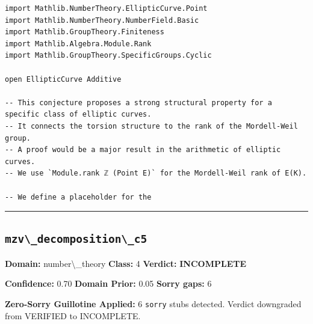\documentclass[12pt,a4paper]{article}
\begin{document}
\begin{lstlisting}[caption={Lean 4 Sketch (v14 Galois)}]
import Mathlib.NumberTheory.EllipticCurve.Point
import Mathlib.NumberTheory.NumberField.Basic
import Mathlib.GroupTheory.Finiteness
import Mathlib.Algebra.Module.Rank
import Mathlib.GroupTheory.SpecificGroups.Cyclic

open EllipticCurve Additive

-- This conjecture proposes a strong structural property for a specific class of elliptic curves.
-- It connects the torsion structure to the rank of the Mordell-Weil group.
-- A proof would be a major result in the arithmetic of elliptic curves.
-- We use `Module.rank ℤ (Point E)` for the Mordell-Weil rank of E(K).

-- We define a placeholder for the 
\end{lstlisting}

\hrule\medskip

\subsection*{\texttt{mzv\textbackslash{}_decomposition\textbackslash{}_c5}}

\textbf{Domain:} number\textbackslash{}_theory \quad \textbf{Class:} 4 \quad \textbf{Verdict:} \textcolor{incompleteamber}{\textbf{INCOMPLETE}}

\textbf{Confidence:} 0.70 \quad \textbf{Domain Prior:} 0.05 \quad \textbf{Sorry gaps:} 6

\textcolor{sorryred}{\textbf{Zero-Sorry Guillotine Applied:} 6 \texttt{sorry} stubs detected. Verdict downgraded from VERIFIED to INCOMPLETE.}
\end{document}
